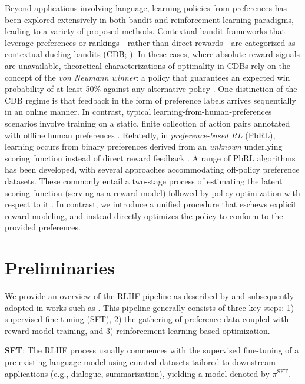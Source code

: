 Beyond applications involving language, learning policies from preferences has been explored extensively in both bandit and reinforcement learning paradigms, leading to a variety of proposed methods. Contextual bandit frameworks that leverage preferences or rankings—rather than direct rewards—are categorized as contextual dueling bandits (CDB; \cite{yue2012karmed,dudik2015contextual}). In these cases, where absolute reward signals are unavailable, theoretical characterizations of optimality in CDBs rely on the concept of the \textit{von Neumann winner}: a policy that guarantees an expected win probability of at least 50\% against any alternative policy \citep{dudik2015contextual}. One distinction of the CDB regime is that feedback in the form of preference labels arrives sequentially in an online manner. In contrast, typical learning-from-human-preferences scenarios involve training on a static, finite collection of action pairs annotated with offline human preferences \citep{yan2022human}. Relatedly, in \textit{preference-based RL} (PbRL), learning occurs from binary preferences derived from an \textit{unknown} underlying scoring function instead of direct reward feedback \citep{BusaFekete2014,ruiz2023dueling}. A range of PbRL algorithms has been developed, with several approaches accommodating off-policy preference datasets. These commonly entail a two-stage process of estimating the latent scoring function (serving as a reward model) followed by policy optimization with respect to it \citep{jain2013learning,BusaFekete2014,christiano2017deep,sadigh2017active,kupcsik2018learning}. In contrast, we introduce a unified procedure that eschews explicit reward modeling, and instead directly optimizes the policy to conform to the provided preferences.

\section{Preliminaries}\label{section:prelims}

We provide an overview of the RLHF pipeline as described by \citeauthor{ziegler2020finetuning} and subsequently adopted in works such as \citep{stiennon2022learning, bai2022training, ouyang2022training}. This pipeline generally consists of three key steps: 1) supervised fine-tuning (SFT), 2) the gathering of preference data coupled with reward model training, and 3) reinforcement learning-based optimization.

\textbf{SFT}: The RLHF process usually commences with the supervised fine-tuning of a pre-existing language model using curated datasets tailored to downstream applications (e.g., dialogue, summarization), yielding a model denoted by $\pi^\text{SFT}$.

